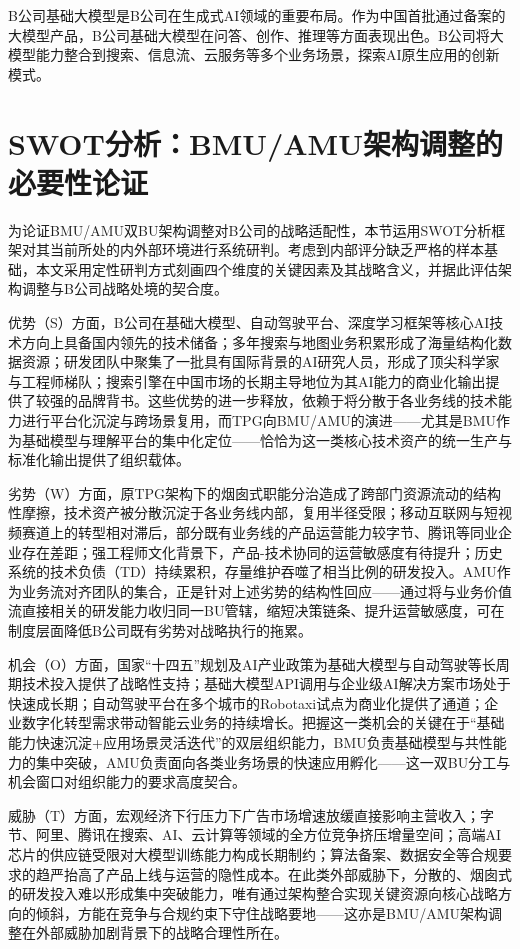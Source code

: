 B公司基础大模型是B公司在生成式AI领域的重要布局。作为中国首批通过备案的大模型产品，B公司基础大模型在问答、创作、推理等方面表现出色。B公司将大模型能力整合到搜索、信息流、云服务等多个业务场景，探索AI原生应用的创新模式。

\section{SWOT分析：BMU/AMU架构调整的必要性论证}

为论证BMU/AMU双BU架构调整对B公司的战略适配性，本节运用SWOT分析框架对其当前所处的内外部环境进行系统研判。考虑到内部评分缺乏严格的样本基础，本文采用定性研判方式刻画四个维度的关键因素及其战略含义，并据此评估架构调整与B公司战略处境的契合度。

优势（S）方面，B公司在基础大模型、自动驾驶平台、深度学习框架等核心AI技术方向上具备国内领先的技术储备；多年搜索与地图业务积累形成了海量结构化数据资源；研发团队中聚集了一批具有国际背景的AI研究人员，形成了顶尖科学家与工程师梯队；搜索引擎在中国市场的长期主导地位为其AI能力的商业化输出提供了较强的品牌背书。这些优势的进一步释放，依赖于将分散于各业务线的技术能力进行平台化沉淀与跨场景复用，而TPG向BMU/AMU的演进——尤其是BMU作为基础模型与理解平台的集中化定位——恰恰为这一类核心技术资产的统一生产与标准化输出提供了组织载体。

劣势（W）方面，原TPG架构下的烟囱式职能分治造成了跨部门资源流动的结构性摩擦，技术资产被分散沉淀于各业务线内部，复用半径受限；移动互联网与短视频赛道上的转型相对滞后，部分既有业务线的产品运营能力较字节、腾讯等同业企业存在差距；强工程师文化背景下，产品-技术协同的运营敏感度有待提升；历史系统的技术负债（TD）持续累积，存量维护吞噬了相当比例的研发投入。AMU作为业务流对齐团队的集合，正是针对上述劣势的结构性回应——通过将与业务价值流直接相关的研发能力收归同一BU管辖，缩短决策链条、提升运营敏感度，可在制度层面降低B公司既有劣势对战略执行的拖累。

机会（O）方面，国家“十四五”规划及AI产业政策为基础大模型与自动驾驶等长周期技术投入提供了战略性支持；基础大模型API调用与企业级AI解决方案市场处于快速成长期；自动驾驶平台在多个城市的Robotaxi试点为商业化提供了通道；企业数字化转型需求带动智能云业务的持续增长。把握这一类机会的关键在于“基础能力快速沉淀+应用场景灵活迭代”的双层组织能力，BMU负责基础模型与共性能力的集中突破，AMU负责面向各类业务场景的快速应用孵化——这一双BU分工与机会窗口对组织能力的要求高度契合。

威胁（T）方面，宏观经济下行压力下广告市场增速放缓直接影响主营收入；字节、阿里、腾讯在搜索、AI、云计算等领域的全方位竞争挤压增量空间；高端AI芯片的供应链受限对大模型训练能力构成长期制约；算法备案、数据安全等合规要求的趋严抬高了产品上线与运营的隐性成本。在此类外部威胁下，分散的、烟囱式的研发投入难以形成集中突破能力，唯有通过架构整合实现关键资源向核心战略方向的倾斜，方能在竞争与合规约束下守住战略要地——这亦是BMU/AMU架构调整在外部威胁加剧背景下的战略合理性所在。

